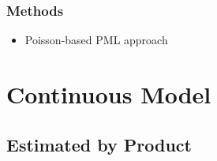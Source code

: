 \documentclass{beamer}
\begin{document}
\begin{frame}
\frametitle{Methods}
\begin{itemize}
\item Poisson-based PML approach
\end{itemize}
\end{frame}

\section{Continuous Model}
\subsection{Estimated by Product}
\begin{frame}
\frametitle{}
\begin{itemize}
\end{itemize}
\end{frame}
\end{document}
